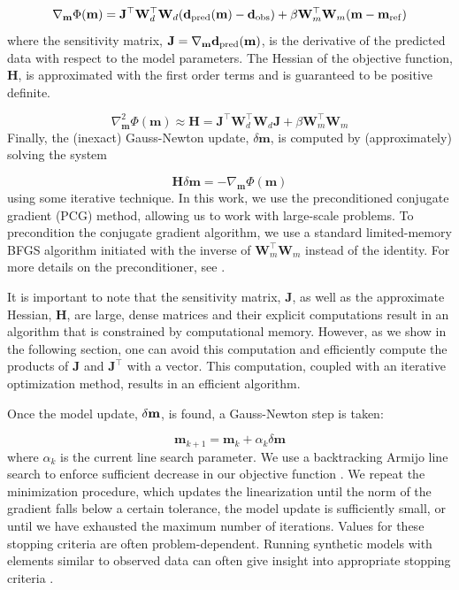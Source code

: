 \documentclass[preprint,review,3p,times,onecolumn,authoryear]{elsarticle}
\newcommand{\bfH}{\mathbf{H}}
\newcommand{\bfJ}{\mathbf{J}}
\newcommand{\bfW}{\mathbf{W}}
\newcommand{\bfm}{\mathbf{m}}
\newcommand{\bfdp}{\mathbf{d}_{\rm pred}}
\begin{document}
\begin{equation}
\label{eq:richards-objective-deriv}
\nabla_{\mathbf{m}} \Phi ( \mathbf{m} ) =  \mathbf{J}^\top \mathbf{W}_d^\top \mathbf{W}_d(\mathbf{d}_{\rm pred}(\mathbf{m}) - \mathbf{d}_{\rm obs})+\beta \mathbf{W}_m^\top \mathbf{W}_m(\mathbf{m}-\mathbf{m}_{\rm ref})
\end{equation}
where the sensitivity matrix, $\bfJ = \nabla_{\bfm} \bfdp(\bfm)$, is the derivative of the predicted data with respect to the model parameters. The Hessian of the objective function, $\bfH$, is approximated with the first order terms and is guaranteed to be positive definite.

\begin{equation}
\label{eq:richards-objective-deriv2}
\nabla^2_{\mathbf{m}} \Phi ( \mathbf{m} )
\approx \mathbf{H} =
\mathbf{J}^\top \mathbf{W}_d^\top \mathbf{W}_d \mathbf{J} +
\beta \mathbf{W}_m^\top \mathbf{W}_m
\end{equation}
Finally, the (inexact) Gauss-Newton update, $\delta \bfm$, is computed by (approximately) solving the system

$$\bfH \delta \bfm = -\nabla_{\bfm} \Phi ( \bfm )$$
using some iterative technique. In this work, we use the preconditioned conjugate gradient (PCG) method, allowing us to work with large-scale problems. To precondition the conjugate gradient algorithm, we use a standard limited-memory BFGS algorithm initiated with the inverse of $\bfW_m^\top\bfW_m$ instead of the identity. For more details on the preconditioner, see \citep{haber2}.

It is important to note that the sensitivity matrix, $\bfJ$, as well as the approximate Hessian, $\bfH$, are large, dense matrices and their explicit computations result in an algorithm that is constrained by computational memory. However, as we show in the following section, one can avoid this computation and efficiently compute the products of $\bfJ$ and $\bfJ^{\top}$ with a vector. This computation, coupled with an iterative optimization method, results in an efficient algorithm.

Once the model update, $\delta \bf m$, is found, a Gauss-Newton step is taken:

$$\bfm_{k+1} = \bfm_{k} + \alpha_k \delta \bfm$$
where $\alpha_k$ is the current line search parameter. We use a backtracking Armijo line search \citep{Armijo1966} to enforce sufficient decrease in our objective function \citep{nw}. We repeat the minimization procedure, which updates the linearization until the norm of the gradient falls below a certain tolerance, the model update is sufficiently small, or until we have exhausted the maximum number of iterations. Values for these stopping criteria are often problem-dependent. Running synthetic models with elements similar to observed data can often give insight into appropriate stopping criteria \citep{Aster2004}.
\end{document}
